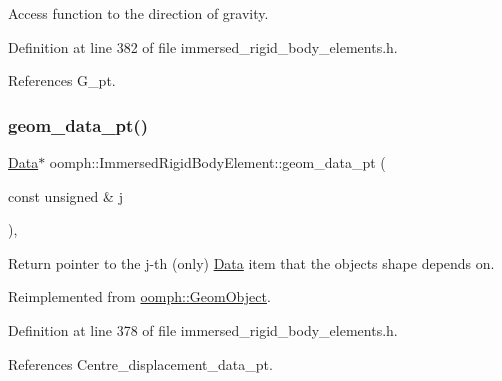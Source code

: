 Access function to the direction of gravity. 



Definition at line 382 of file immersed\+\_\+rigid\+\_\+body\+\_\+elements.\+h.



References G\+\_\+pt.

\mbox{\label{classoomph_1_1ImmersedRigidBodyElement_adf0e61dfcf35f8be55dab30dd8e0ccb5}} 
\subsubsection{\texorpdfstring{geom\+\_\+data\+\_\+pt()}{geom\_data\_pt()}}
{\footnotesize\ttfamily \hyperlink{classoomph_1_1Data}{Data}$\ast$ oomph\+::\+Immersed\+Rigid\+Body\+Element\+::geom\+\_\+data\+\_\+pt (\begin{DoxyParamCaption}\item[{const unsigned \&}]{j }\end{DoxyParamCaption})\hspace{0.3cm}{\ttfamily [inline]}, {\ttfamily [virtual]}}



Return pointer to the j-\/th (only) \hyperlink{classoomph_1_1Data}{Data} item that the object\textquotesingle{}s shape depends on. 



Reimplemented from \hyperlink{classoomph_1_1GeomObject_ae1940fc6a3050e645c3882f2f6f3a202}{oomph\+::\+Geom\+Object}.



Definition at line 378 of file immersed\+\_\+rigid\+\_\+body\+\_\+elements.\+h.



References Centre\+\_\+displacement\+\_\+data\+\_\+pt.

\mbox{\label{classoomph_1_1ImmersedRigidBodyElement_ae901e5528aad0dbc2eb7cb43849ae606}} 
